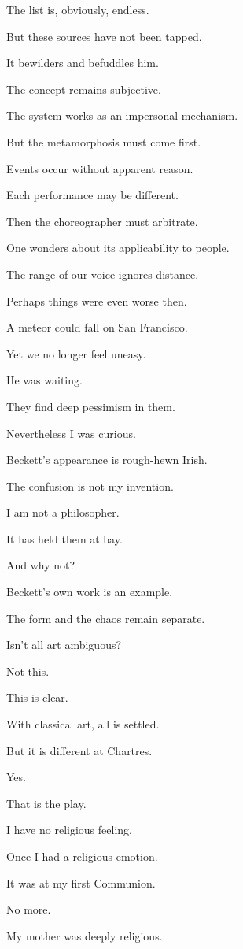 \documentclass[11pt]{article}
\begin{document}
The list is, obviously, endless. 

But these sources have not been tapped. 

It bewilders and befuddles him. 

The concept remains subjective. 

The system works as an impersonal mechanism. 

But the metamorphosis must come first. 

Events occur without apparent reason. 

Each performance may be different. 

Then the choreographer must arbitrate. 

One wonders about its applicability to people. 

The range of our voice ignores distance. 


Perhaps things were even worse then. 

A meteor could fall on San Francisco. 

Yet we no longer feel uneasy. 


He was waiting. 

They find deep pessimism in them. 

Nevertheless I was curious. 

Beckett's appearance is rough-hewn Irish. 

The confusion is not my invention. 

I am not a philosopher. 

It has held them at bay. 

And why not?

Beckett's own work is an example. 

The form and the chaos remain separate. 

Isn't all art ambiguous?

Not this. 

This is clear. 

With classical art, all is settled. 

But it is different at Chartres. 

Yes. 

That is the play. 

I have no religious feeling. 

Once I had a religious emotion. 

It was at my first Communion. 

No more. 

My mother was deeply religious. 
\end{document}
